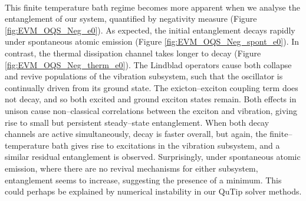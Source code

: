 \documentclass[11pt]{article}
\begin{document}
\\
This finite temperature bath regime becomes more apparent when we analyse the entanglement of our system, quantified by negativity measure (Figure \ref{fig:EVM_OQS_Neg_e0}). As expected, the initial entanglement decays rapidly under spontaneous atomic emission (Figure \ref{fig:EVM_OQS_Neg_spont_e0}). In contrast, the thermal dissipation channel takes longer to decay (Figure \ref{fig:EVM_OQS_Neg_therm_e0}). The Lindblad operators cause both collapse and revive populations of the vibration subsystem, such that the oscillator is continually driven from its ground state. The exicton--exciton coupling term does not decay, and so both excited and ground exciton states remain. Both effects in unison cause non--classical correlations between the exciton and vibration, giving rise to small but persistent steady--state entanglement. When both decay channels are active simultaneously, decay is faster overall, but again, the finite--temperature bath gives rise to excitations in the vibration subsystem, and a similar residual entanglement is observed. Surprisingly, under spontaneous atomic emission, where there are no revival mechanisms for either subsystem, entanglement seems to increase, suggesting the presence of a minimum. This could perhaps be explained by numerical instability in our QuTip solver methods.\\
\\
\end{document}
